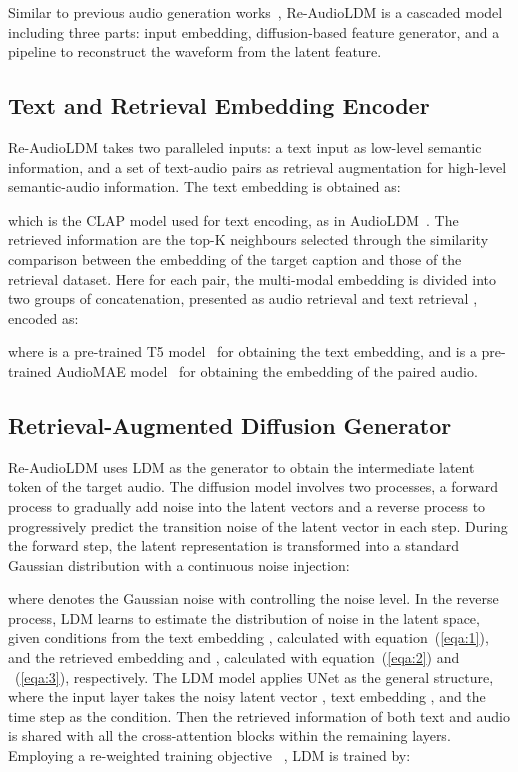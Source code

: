 \documentclass{article}
\begin{document}
Similar to previous audio generation works~\cite{audioldm,tango,tuning}, Re-AudioLDM is a cascaded model including three parts: input embedding, diffusion-based feature generator, and a pipeline to reconstruct the waveform from the latent feature. 
\subsection{Text and Retrieval Embedding Encoder}
\label{sec:encoder}
Re-AudioLDM takes two paralleled inputs: a text input  as low-level semantic information, and a set of text-audio pairs as retrieval augmentation  for high-level semantic-audio information. The text embedding  is obtained as: 

which  is the CLAP model \cite{clap} used for text encoding, as in AudioLDM~\cite{audioldm}. The retrieved information  are the top-K neighbours selected through the similarity comparison between the embedding of the target caption and those of the retrieval dataset. Here for each pair, the multi-modal embedding is divided into two groups of concatenation, presented as audio retrieval  and text retrieval , encoded as:


\noindent
where  is a pre-trained T5 model~\cite{t5} for obtaining the text embedding, and  is a pre-trained AudioMAE model~\cite{mae} for obtaining the embedding of the paired audio. 
\subsection{Retrieval-Augmented Diffusion Generator}
Re-AudioLDM uses LDM as the generator to obtain the intermediate latent token of the target audio. The diffusion model involves two processes, a forward process to gradually add noise into the latent vectors and a reverse process to progressively predict the transition noise of the latent vector in each step. During the forward step, the latent representation  is transformed into a standard Gaussian distribution  with a continuous noise injection:
 
\noindent
where  denotes the Gaussian noise with  controlling the noise level. 
In the reverse process, LDM learns to estimate the distribution of noise  in the latent space, given conditions from the text embedding , calculated with equation~(\ref{eqa:1}), and the retrieved embedding  and , calculated with equation~(\ref{eqa:2}) and ~(\ref{eqa:3}), respectively.
The LDM model applies UNet as the general structure, where the input layer takes the noisy latent vector , text embedding , and the time step  as the condition. Then the retrieved information of both text and audio is shared with all the cross-attention blocks within the remaining layers. Employing a re-weighted training objective ~\cite{DDPM}, LDM is trained by:
\end{document}
